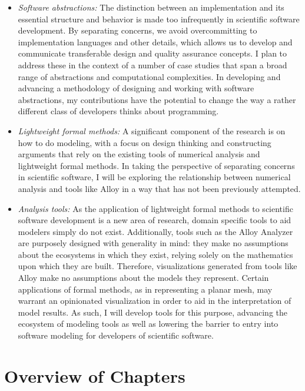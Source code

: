 \documentclass[12pt]{article}
\begin{document}
\begin{itemize}
    \item \emph{Software abstractions:}  The distinction between an implementation and its essential structure and behavior is made too infrequently in scientific software development.  By separating concerns, we avoid overcommitting to implementation languages and other details, which allows us to develop and communicate transferable design and quality assurance concepts.  I plan to address these in the context of a number of case studies that span a broad range of abstractions and computational complexities.  In developing and advancing a methodology of designing and working with software abstractions, my contributions have the potential to change the way a rather different class of developers thinks about programming.
    \item \emph{Lightweight formal methods:}  A significant component of the research is on how to do modeling, with a focus on design thinking and constructing arguments that rely on the existing tools of numerical analysis and lightweight formal methods.  In taking the perspective of separating concerns in scientific software, I will be exploring the relationship between numerical analysis and tools like Alloy in a way that has not been previously attempted.
    \item \emph{Analysis tools:}  As the application of lightweight formal methods to scientific software development is a new area of research, domain specific tools to aid modelers simply do not exist.  Additionally, tools such as the Alloy Analyzer are purposely designed with generality in mind: they make no assumptions about the ecosystems in which they exist, relying solely on the mathematics upon which they are built.  Therefore, visualizations generated from tools like Alloy make no assumptions about the models they represent.  Certain applications of formal methods, as in representing a planar mesh, may warrant an opinionated visualization in order to aid in the interpretation of model results.  As such, I will develop tools for this purpose, advancing the ecosystem of modeling tools as well as lowering the barrier to entry into software modeling for developers of scientific software.
\end{itemize}

\section{Overview of Chapters}
\end{document}
